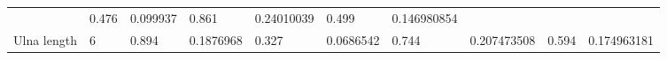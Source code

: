 \documentclass[11pt]{article}
\begin{document}
\begin{longtable}[]{@{}llllllllll@{}}
\begin{minipage}[t]{0.07\columnwidth}
\end{minipage} & \begin{minipage}[t]{0.07\columnwidth}\raggedright
0.476\strut
\end{minipage} & \begin{minipage}[t]{0.07\columnwidth}\raggedright
0.099937\strut
\end{minipage} & \begin{minipage}[t]{0.07\columnwidth}\raggedright
0.861\strut
\end{minipage} & \begin{minipage}[t]{0.07\columnwidth}\raggedright
0.24010039\strut
\end{minipage} & \begin{minipage}[t]{0.07\columnwidth}\raggedright
0.499\strut
\end{minipage} & \begin{minipage}[t]{0.07\columnwidth}\raggedright
0.146980854\strut
\end{minipage}\tabularnewline
\begin{minipage}[t]{0.07\columnwidth}\raggedright
Ulna length\strut
\end{minipage} & \begin{minipage}[t]{0.07\columnwidth}\raggedright
6\strut
\end{minipage} & \begin{minipage}[t]{0.07\columnwidth}\raggedright
0.894\strut
\end{minipage} & \begin{minipage}[t]{0.07\columnwidth}\raggedright
0.1876968\strut
\end{minipage} & \begin{minipage}[t]{0.07\columnwidth}\raggedright
0.327\strut
\end{minipage} & \begin{minipage}[t]{0.07\columnwidth}\raggedright
0.0686542\strut
\end{minipage} & \begin{minipage}[t]{0.07\columnwidth}\raggedright
0.744\strut
\end{minipage} & \begin{minipage}[t]{0.07\columnwidth}\raggedright
0.207473508\strut
\end{minipage} & \begin{minipage}[t]{0.07\columnwidth}\raggedright
0.594\strut
\end{minipage} & \begin{minipage}[t]{0.07\columnwidth}\raggedright
0.174963181\strut
\end{minipage}\tabularnewline

\end{longtable}
\end{document}

